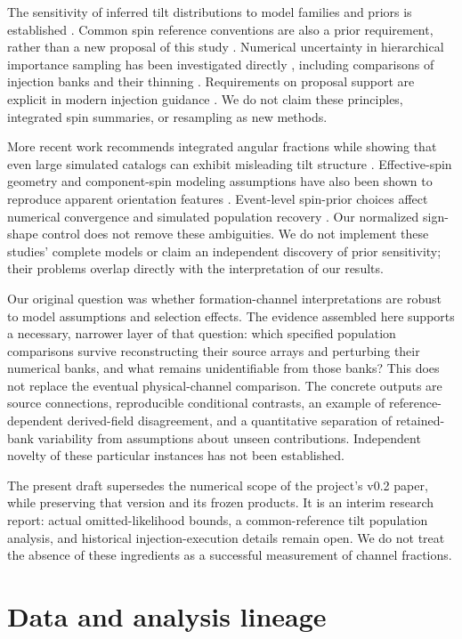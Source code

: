 The sensitivity of inferred tilt distributions to model families and priors is established \cite{spinlike}. Common spin reference conventions are also a prior requirement, rather than a new proposal of this study \cite{infinity}. Numerical uncertainty in hierarchical importance sampling has been investigated directly \cite{growing}, including comparisons of injection banks and their thinning \cite{structure}. Requirements on proposal support are explicit in modern injection guidance \cite{injections}. We do not claim these principles, integrated spin summaries, or resampling as new methods.

More recent work recommends integrated angular fractions while showing that even large simulated catalogs can exhibit misleading tilt structure \cite{longroad}. Effective-spin geometry and component-spin modeling assumptions have also been shown to reproduce apparent orientation features \cite{degeneracies}. Event-level spin-prior choices affect numerical convergence and simulated population recovery \cite{spinpriors}. Our normalized sign-shape control does not remove these ambiguities. We do not implement these studies' complete models or claim an independent discovery of prior sensitivity; their problems overlap directly with the interpretation of our results.

Our original question was whether formation-channel interpretations are robust to model assumptions and selection effects. The evidence assembled here supports a necessary, narrower layer of that question: which specified population comparisons survive reconstructing their source arrays and perturbing their numerical banks, and what remains unidentifiable from those banks? This does not replace the eventual physical-channel comparison. The concrete outputs are source connections, reproducible conditional contrasts, an example of reference-dependent derived-field disagreement, and a quantitative separation of retained-bank variability from assumptions about unseen contributions. Independent novelty of these particular instances has not been established.

The present draft supersedes the numerical scope of the project's v0.2 paper, while preserving that version and its frozen products. It is an interim research report: actual omitted-likelihood bounds, a common-reference tilt population analysis, and historical injection-execution details remain open. We do not treat the absence of these ingredients as a successful measurement of channel fractions.

\section{Data and analysis lineage}\label{sec:data}
